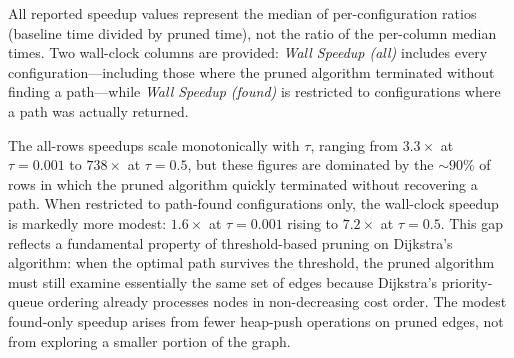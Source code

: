 \begin{table}[htbp]
\centering
\small
\renewcommand{\arraystretch}{1.3}
\caption[Speedup by pruning threshold $\tau$]{Median speedups by pruning threshold $\tau$. ``Wall Speedup (all)'' includes rows where the pruned algorithm terminated without finding a path; ``Wall Speedup (found)'' is restricted to configurations where a path was returned.}
\label{table:speedup_tau}
\end{table}

All reported speedup values represent the median of per-configuration ratios (baseline time divided by pruned time), not the ratio of the per-column median times. Two wall-clock columns are provided: \emph{Wall Speedup (all)} includes every configuration---including those where the pruned algorithm terminated without finding a path---while \emph{Wall Speedup (found)} is restricted to configurations where a path was actually returned.

The all-rows speedups scale monotonically with $\tau$, ranging from $3.3\times$ at $\tau=0.001$ to $738\times$ at $\tau=0.5$, but these figures are dominated by the ${\sim}90\%$ of rows in which the pruned algorithm quickly terminated without recovering a path. When restricted to path-found configurations only, the wall-clock speedup is markedly more modest: $1.6\times$ at $\tau=0.001$ rising to $7.2\times$ at $\tau=0.5$. This gap reflects a fundamental property of threshold-based pruning on Dijkstra's algorithm: when the optimal path survives the threshold, the pruned algorithm must still examine essentially the same set of edges because Dijkstra's priority-queue ordering already processes nodes in non-decreasing cost order. The modest found-only speedup arises from fewer heap-push operations on pruned edges, not from exploring a smaller portion of the graph.

